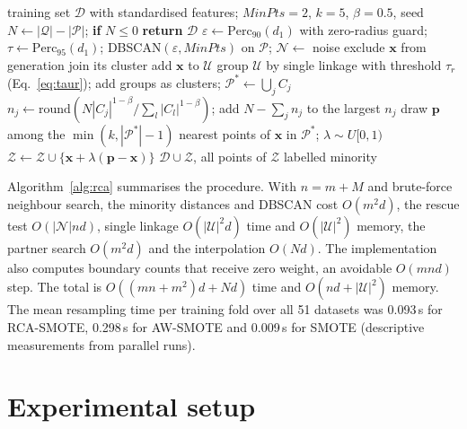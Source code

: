 \documentclass[preprint,nopreprintline]{elsarticle}
\theoremstyle{plain}
\theoremstyle{definition}
\begin{document}
\begin{algorithm}[!htb]
\caption{RCA-SMOTE (frozen configuration)}\label{alg:rca}
\begin{algorithmic}[1]
\small
\Require training set $\mathcal{D}$ with standardised features; $\textit{MinPts}=2$, $k=5$, $\beta=0.5$, seed
\State $N\gets|\mathcal{Q}|-|\mathcal{P}|$; \textbf{if} $N\le0$ \textbf{return} $\mathcal{D}$
\State $\varepsilon\gets\mathrm{Perc}_{90}(d_1)$ with zero-radius guard; $\tau\gets\mathrm{Perc}_{95}(d_1)$; DBSCAN$(\varepsilon,\textit{MinPts})$ on $\mathcal{P}$; $\mathcal{N}\gets$ noise
   exclude $\mathbf{x}$ from generation
   join its cluster
  \Else{} add $\mathbf{x}$ to $\mathcal{U}$
  \EndIf
\EndFor
\State group $\mathcal{U}$ by single linkage with threshold $\tau_r$ (Eq.~\ref{eq:taur}); add groups as clusters; $\mathcal{P}^{*}\gets\bigcup_jC_j$
\State $n_j\gets\mathrm{round}(N|C_j|^{1-\beta}/\sum_l|C_l|^{1-\beta})$; add $N-\sum_jn_j$ to the largest $n_j$
  \State draw $\mathbf{p}$ among the $\min(k,|\mathcal{P}^{*}|-1)$ nearest points of $\mathbf{x}$ in $\mathcal{P}^{*}$; $\lambda\sim U[0,1)$
  \State $\mathcal{Z}\gets\mathcal{Z}\cup\{\mathbf{x}+\lambda(\mathbf{p}-\mathbf{x})\}$
\EndFor
\State \Return $\mathcal{D}\cup\mathcal{Z}$, all points of $\mathcal{Z}$ labelled minority
\end{algorithmic}
\end{algorithm}

Algorithm~\ref{alg:rca} summarises the procedure. With $n=m+M$ and brute-force neighbour search, the minority distances and DBSCAN cost $O(m^2d)$, the rescue test $O(|\mathcal{N}|nd)$, single linkage $O(|\mathcal{U}|^2d)$ time and $O(|\mathcal{U}|^2)$ memory, the partner search $O(m^2d)$ and the interpolation $O(Nd)$. The implementation also computes boundary counts that receive zero weight, an avoidable $O(mnd)$ step. The total is $O((mn+m^2)d+Nd)$ time and $O(nd+|\mathcal{U}|^2)$ memory. The mean resampling time per training fold over all 51 datasets was 0.093\,s for RCA-SMOTE, 0.298\,s for AW-SMOTE and 0.009\,s for SMOTE (descriptive measurements from parallel runs).

\section{Experimental setup}\label{sec:setup}
\end{document}
